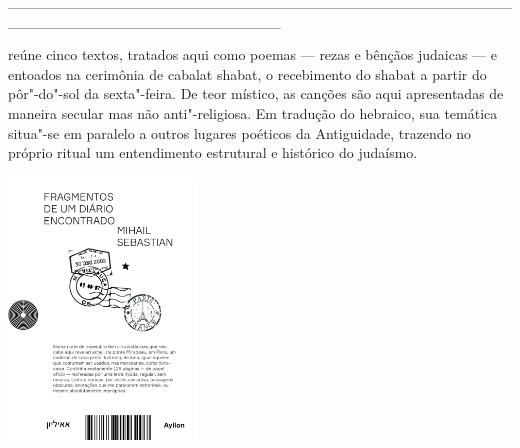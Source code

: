 \hspace*{-2cm}\_\_\_\_\_\_\_\_\_\_\_\_\_\_\_\_\_\_\_\_\_\_\_\_\_\_\_\_\_\_\_\_\_\_\_\_\_\_\_\_\_\_\_\_\_\_\_\_\_\_\_\_\_\_\_\_\_\_\_\_\_\_\_\_\_\_\_\_\_\_\_\_\_\_

\medskip

 reúne cinco textos, tratados aqui como poemas --- rezas e bênçãos judaicas --- e entoados na cerimônia de cabalat shabat, o recebimento do shabat a partir do pôr"-do"-sol da sexta"-feira. De teor místico, as canções são aqui apresentadas de maneira secular mas não anti"-religiosa. Em tradução do hebraico, sua temática situa"-se em paralelo a outros lugares poéticos da Antiguidade, trazendo no próprio ritual um entendimento estrutural e histórico do judaísmo. %

\hspace{.5cm}

\hspace*{-.4cm}\begin{minipage}[c]{0.60\linewidth}
\small{
{}}
\end{minipage}


\pagebreak

\hspace{.5cm}

\begin{center}
\hspace*{-.5cm}\includegraphics[width=50mm]{./imgs/diario.png}
\end{center}


